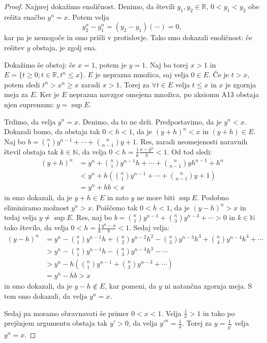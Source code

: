 \documentclass[10pt, a4paper]{article}
\newenvironment{noticeC}{%
  \tcolorbox[%
  notitle,
  empty,
  enhanced,  %
  breakable,
  coltext=black, 
  fontupper=\rmfamily,
  parbox=false,
  noparskip,
  sharp corners,
  boxrule=-1pt,  %
  frame hidden,
  left=7pt,  %
  right=7pt,
  top=5pt,
  bottom=5pt,
  before skip=2.5ex plus 2pt,
  after skip=2.5ex plus 2pt,
  overlay unbroken and last={%
  },
  ]}
{\endtcolorbox}
\newenvironment{dokaz}%
  {\begin{noticeC}\begin{proof}}%
  {\end{proof}\end{noticeC}}
\newcommand{\N}{\mathbb {N}}
\newcommand{\R}{\mathbb {R}}
\begin{document}
\begin{dokaz}
            Najprej dokažimo enoličnost. Denimo, da števili $y_1, y_2 \in \R$, $0 < y_1 <y_2$ obe rešita enačbo $y^n = x$.
            Potem velja $$y_2^{n} - y_1^{n} = (y_2 - y_1)(\cdots) = 0,$$ kar pa je nemogoče in smo prišli v protislovje. Tako smo dokazali enoličnost: če rešitev $y$ obstaja, je zgolj ena.
            
            Dokažimo še obstoj:
            če $x=1$, potem je $y=1$. Naj bo torej $x > 1$ in $E = \{t \geq 0; t \in \R, t^n \leq x\}$.
                $E$ je neprazna množica, saj velja $0 \in E$.
                Če je $t > x$, potem sledi $t^n > x^n \geq x$ zaradi $x > 1$. Torej za $\forall t \in E$ velja $t\leq x$ in $x$ je zgornja meja za $E$.
                Ker je $E$ neprazna navzgor omejena množica, po aksiomu A13 obstaja njen supremum: $y = \sup E$.
                
                Trdimo, da velja $y^n = x$. Denimo, da to ne drži. Predpostavimo, da je $y^n < x$. Dokazali bomo, da obstaja tak $0<h<1$, da je $(y+h)^n < x$ in $(y+h)\in E$.
                Naj bo $b = \binom{n}{1} y^{n-1} + \cdots + \binom{n}{n-1}y + 1.$
                Res, zaradi neomejenosti naravnih števil obstaja tak $k \in \N$, da velja $0 < h = \frac{1}{k} \frac{x-y^n}{b} < 1$. Od tod sledi:
                \begin{align*}
                    (y+h)^n &= y^n + \binom{n}{1} y^{n-1} h + \cdots + \binom{n}{n-1}y h^{n-1} + h^n\\
                    &< y^n + h \left(\binom{n}{1} y^{n-1} + \cdots + \binom{n}{n-1}y + 1 \right)\\
                    &= y^n + hb < x
                \end{align*}
                in smo dokazali, da je $y+h \in E$ in zato $y$ ne more biti $\sup E$. 
                Podobno eliminiramo možnost $y^n > x$. Poiščemo tak $0<h<1$, da je $(y-h)^n > x$ in tedaj velja $y \neq \sup E$. 
                Res, naj bo $b = \binom{n}{1}y^{n-1} + \binom{n}{3}y^{n-3} + \cdots > 0$ in $k \in \N$ tako število, da velja $0 < h = \frac{1}{k} \frac{y^n-x}{b} < 1$.
                Sedaj velja:
                \begin{align*}
                    (y-h)^n &= y^n - \binom{n}{1}y^{n-1}h + \binom{n}{2}y^{n-2}h^2 - \binom{n}{3}y^{n-3}h^{3} + \binom{n}{4}y^{n-4}h^4 + \cdots\\
                    &> y^n - \binom{n}{1}y^{n-1}h - \binom{n}{3}y^{n-3}h^{3} - \cdots\\
                    &> y^n - h \left( \binom{n}{1}y^{n-1} + \binom{n}{3}y^{n-3} + \cdots \right) \\
                    &= y^n - h b >x
                \end{align*}
                in smo dokazali, da je $y-h \notin E$, kar pomeni, da $y$ ni natančna zgornja meja. S tem smo dokazali, da velja $y^n = x$.
            
            Sedaj pa moramo obravnavati še primer $0<x<1$. Velja $\frac{1}{x} > 1$ in tako po prejšnjem argumentu obstaja tak $y'>0$, da velja $y'^n = \frac{1}{x}$. Torej za $y = \frac{1}{y'}$ velja $y^n = x$.
\end{dokaz}
\end{document}
